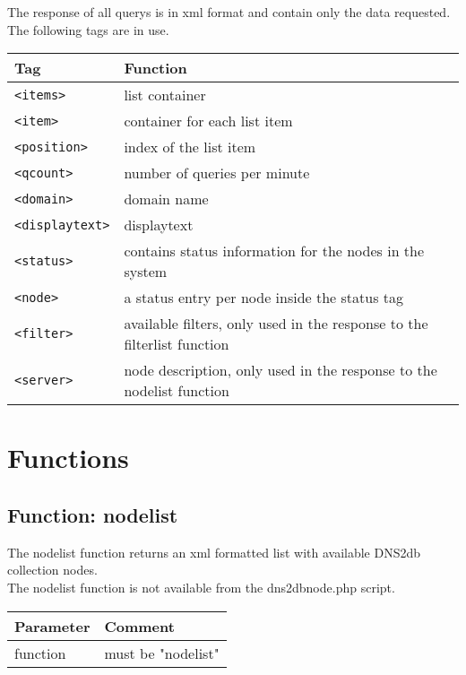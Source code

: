 \documentclass[a4paper]{article}
\begin{document}
The response of all querys is in xml format and contain only the data requested. The following tags are in use.


\begin{center}
    \begin{tabular}{ | l | p{10cm} |}
        \hline
        \textbf{Tag} & \textbf{Function}  \\ \hline
        \verb|<items>|&
        list container  \\ \hline
        \verb|<item>|&
        container for each list item \\ \hline
        \verb|<position>|&
        index of the list item \\ \hline
        \verb|<qcount>|&
        number of queries per minute\\ \hline
        \verb|<domain>|&
        domain name\\ \hline
        \verb|<displaytext>|&
        displaytext\\ \hline
        \verb|<status>|&
        contains status information for the nodes in the system \\ \hline
        \verb|<node>|&
        a status entry per node inside the status tag \\ \hline
        \verb|<filter>|&
        available filters, only used in the response to the filterlist function \\ \hline
        \verb|<server>|&
        node description, only used in the response to the nodelist function \\ \hline
    \end{tabular}
\end{center}


\newpage
\section{Functions}

    \subsection{Function: nodelist}

	The nodelist function returns an xml formatted list with available DNS2db collection nodes.\\
	The nodelist function is not available from the dns2dbnode.php script.

\begin{center}
    \begin{tabular}{ | l | p{6cm} |}
    \hline
    \textbf{Parameter} & \textbf{Comment}  
    \\ \hline
    function
    &
    must be "nodelist"
    \\ \hline
    \end{tabular}
\end{center}
\end{document}
